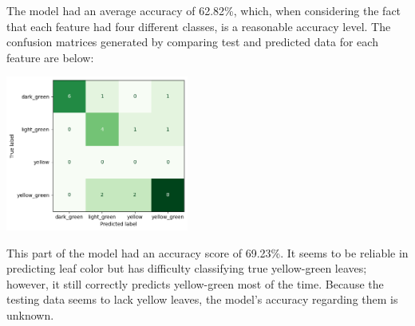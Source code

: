 \documentclass[final,5p,times,twocolumn,authoryear]{elsarticle}
\begin{document}
\begin{center}
\label{Table1}
\end{center}

The model had an average accuracy of 62.82\%, which, when considering the fact that each feature had four different classes, is a reasonable accuracy level. The confusion matrices generated by comparing test and predicted data for each feature are below:

\begin{center}
    \includegraphics[width=0.45\textwidth]{images/morph_conf_matrix/color.png}
\end{center}

This part of the model had an accuracy score of 69.23\%. It seems to be reliable in predicting leaf color but has difficulty classifying true yellow-green leaves; however, it still correctly predicts yellow-green most of the time. Because the testing data seems to lack yellow leaves, the model's accuracy regarding them is unknown.
\end{document}
